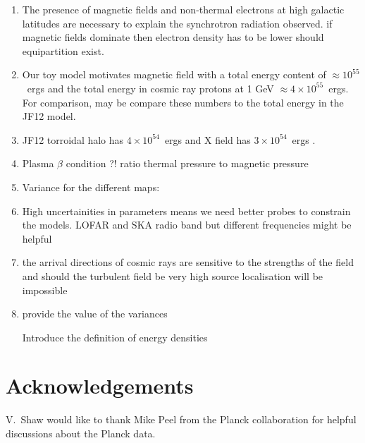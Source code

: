 \documentclass[usenatbib]{mnras}
\newcommand{\Vasu}[1]{{\color{purple}#1}}
\begin{document}
\begin{enumerate}

    \item The presence of magnetic fields and non-thermal electrons at high galactic latitudes are necessary to explain the synchrotron radiation observed. if magnetic fields dominate then electron density has to be lower should equipartition exist. %
    \item Our toy model motivates magnetic field with a total energy content of $\approx 10^{55}$~ergs and the total energy in cosmic ray protons at 1 GeV $\approx 4\times 10^{55}$~ergs. For comparison, may be compare these numbers to the total energy in the JF12 model. 
    \item JF12 torroidal halo has $4\times 10^{54}$~ergs and X field has $3\times 10^{54}$~ergs \cite{Taylor_2019}.
    \item Plasma $\beta$ condition ?! ratio thermal pressure to magnetic pressure \cite{Drury_2012}
    \item Variance for the different maps:
    
    \item High uncertainities in parameters means we need better probes to constrain the models. LOFAR and SKA radio band but different frequencies might be helpful
    \item the arrival directions of cosmic rays are sensitive to the strengths of the field and should 
    the turbulent field be very high source localisation will be impossible
    \item provide the value of the variances
    
    \Vasu{Introduce the definition of energy 
    densities}
    
\end{enumerate}



\section*{Acknowledgements}
V.~Shaw would like to thank Mike Peel from the Planck collaboration for helpful discussions about the Planck data.



\end{document}
